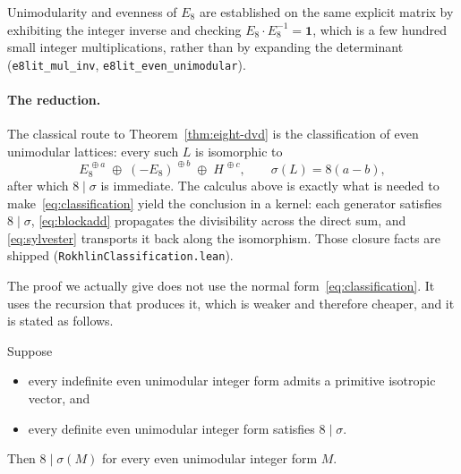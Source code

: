 Unimodularity and evenness of $E_8$ are established on the same explicit
matrix by exhibiting the integer inverse and checking
$E_8 \cdot E_8^{-1} = \mathbf{1}$, which is a few hundred small integer
multiplications, rather than by expanding the determinant
(\texttt{e8lit\_mul\_inv}, \texttt{e8lit\_even\_unimodular}).

\paragraph{The reduction.}
The classical route to Theorem~\ref{thm:eight-dvd} is the classification
of even unimodular lattices: every such $L$ is isomorphic to
\begin{equation}
E_8^{\,\oplus a} \;\oplus\; (-E_8)^{\,\oplus b} \;\oplus\; H^{\,\oplus c},
\qquad \sigma(L) = 8(a-b),
\label{eq:classification}
\end{equation}
after which $8\mid\sigma$ is immediate. The calculus above is exactly
what is needed to make~\eqref{eq:classification} yield the conclusion in
a kernel: each generator satisfies $8\mid\sigma$,
\eqref{eq:blockadd} propagates the divisibility across the direct sum, and
\eqref{eq:sylvester} transports it back along the isomorphism. Those
closure facts are shipped (\texttt{RokhlinClassification.lean}).

The proof we actually give does not use the normal
form~\eqref{eq:classification}. It uses the recursion that produces it,
which is weaker and therefore cheaper, and it is stated as follows.

\begin{proposition}
\label{prop:reduction}
Suppose
\begin{itemize}
\item[{\rm[HM]}] every indefinite even unimodular integer form admits a
primitive isotropic vector, and
\item[{\rm[$\Theta$]}] every definite even unimodular integer form
satisfies $8\mid\sigma$.
\end{itemize}
Then $8\mid\sigma(M)$ for every even unimodular integer form $M$.
\end{proposition}

